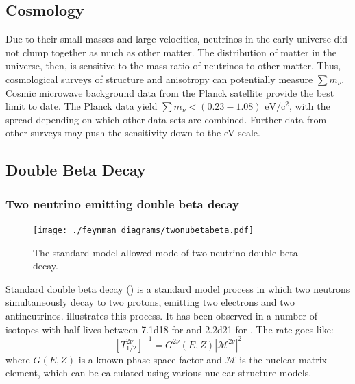 \documentclass[herrin-thesis.tex]{subfiles}
\begin{document}
\subsection{Cosmology}
Due to their small masses and large velocities, neutrinos in the early universe did not clump together as much as other matter. The distribution of matter in the universe, then, is sensitive to the mass ratio of neutrinos to other matter. Thus, cosmological surveys of structure and anisotropy can potentially measure \(\sum m_{\nu}\). Cosmic microwave background data from the Planck satellite provide the best limit to date. The Planck data yield \(\sum m_{\nu} < (0.23 - 1.08) \text{ eV}/\text{c}^2\), with the spread depending on which other data sets are combined\cite{Ade:2013kl}. Further data from other surveys may push the sensitivity down to the \si{\eV} scale\cite{Abazajian:2011dt}.

\subsection{Double Beta Decay}
\label{sec:nu_doublebetadecay}

\subsubsection{Two neutrino emitting double beta decay}

\begin{figure}[tbp]
	\centering
	\texttt{[image: ./feynman\_diagrams/twonubetabeta.pdf]}
	\caption[Diagram of \(2\nu\beta\beta\)]{The standard model allowed mode of two neutrino double beta decay.}
	\label{fig:nu_diagram_2nubb}
\end{figure}

Standard double beta decay (\twonu{}) is a standard model process in which two neutrons simultaneously decay to two protons, emitting two electrons and two antineutrinos.  illustrates this process. It has been observed in a number of isotopes with half lives between \SI{7.1d18}{\year} for \cite{Arnold:2005hc} and \SI{2.2d21}{\year} for \cite{Auger:2012ar}. The rate goes like:
\begin{equation}
\left [ T^{2\nu}_{1/2} \right ]^{-1} = G^{2\nu}\left(E, Z\right)\left| \mathcal{M}^{2\nu}\right |^2
\label{eq:nu_twonu_rate}
\end{equation}
where \(G(E,Z)\) is a known phase space factor and \(\mathcal{M}\) is the nuclear matrix element, which can be calculated using various nuclear structure models.
\end{document}
